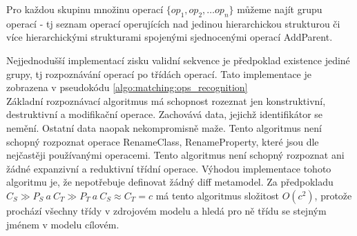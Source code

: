 \documentclass[11pt,twoside,a4paper]{book}
\begin{document}
 Pro každou skupinu množinu operací $\{op_1, op_2, \ldots op_n\}$ můžeme najít
 grupu operací - tj seznam operací operujících nad jedinou hierarchickou
 strukturou či více hierarchickými strukturami spojenými sjednocenými operací
 AddParent.
 
 Nejjednodušší implementací zisku validní sekvence je předpoklad existence
 jediné grupy, tj rozpoznávání operací po třídách operací. 
 Tato implementace je zobrazena v pseudokódu \ref{algo:matching:ops_recognition}
 \\
 Základní rozpoznávací algoritmus má schopnost rozeznat jen konstruktivní,
 destruktivní a modifikační operace. Zachovává data, jejichž identifikátor se
 nemění.
 Ostatní data naopak nekompromisně maže. Tento algoritmus není schopný
 rozpoznat operace RenameClass, RenameProperty, které jsou dle \cite{Luksch}
 nejčastěji používanými operacemi. Tento algoritmus není schopný
 rozpoznat ani žádné expanzivní a reduktivní třídní operace. Výhodou
 implementace tohoto algoritmu je, že nepotřebuje definovat žádný diff
 metamodel. Za předpokladu $C_S \gg P_S \ a\ C_T \gg P_T \ a\  C_S \approx C_T =
 c$ má tento algoritmus složitost $O(c^2)$, protože
 prochází všechny třídy v zdrojovém modelu a hledá pro ně třídu se stejným
 jménem v modelu cílovém.
 
 
\end{document}
